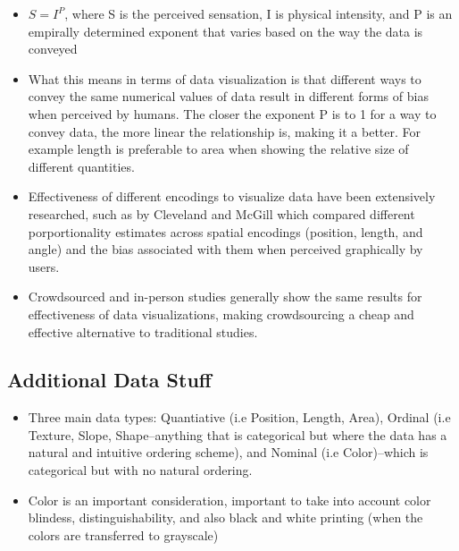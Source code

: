 \begin{itemize}
  \item $S=I^{P}$, where S is the perceived sensation, I is physical intensity, and P is an empirally determined exponent that varies based on the way the data is conveyed
  \item What this means in terms of data visualization is that different ways to convey the same numerical values of data result in different forms of bias when perceived by humans. The closer the exponent P is to 1 for a way to convey data, the more linear the relationship is, making it a better. For example length is preferable to area when showing the relative size of different quantities.
  \item Effectiveness of different encodings to visualize data have been extensively researched, such as by Cleveland and McGill which compared different porportionality estimates across spatial encodings (position, length, and angle) and the bias associated with them when perceived graphically by users.
  \item Crowdsourced and in-person studies generally show the same results for effectiveness of data visualizations, making crowdsourcing a cheap and effective alternative to traditional studies.

\end{itemize}

\subsection{Additional Data Stuff}

\begin{itemize}
  \item Three main data types: Quantiative (i.e Position, Length, Area), Ordinal (i.e Texture, Slope, Shape--anything that is categorical but where the data has a natural and intuitive ordering scheme), and Nominal (i.e Color)--which is categorical but with no natural ordering. 
  \item Color is an important consideration, important to take into account color blindess, distinguishability, and also black and white printing (when the colors are transferred to grayscale)

\end{itemize}

